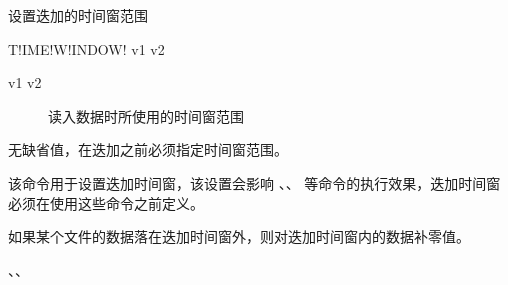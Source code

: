 \label{sss:timewindow}

设置迭加的时间窗范围

\begin{SACSTX}
T!IME!W!INDOW! v1 v2
\end{SACSTX}

\begin{description}
\item [v1 v2] 读入数据时所使用的时间窗范围
\end{description}

无缺省值，在迭加之前必须指定时间窗范围。

该命令用于设置迭加时间窗，该设置会影响 、、 等命令的执行效果，迭加时间窗必须在使用这些命令之前定义。

如果某个文件的数据落在迭加时间窗外，则对迭加时间窗内的数据补零值。

、、
